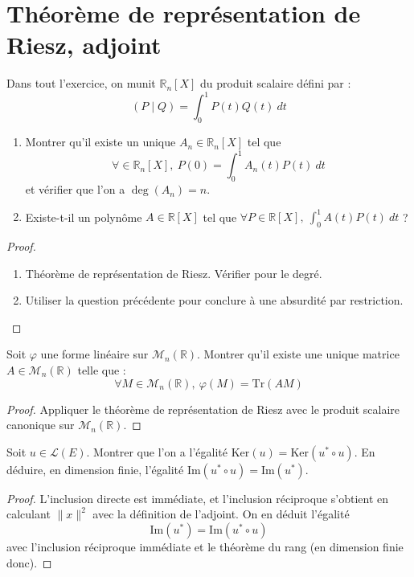 \documentclass[french,a4paper]{article}
\newcommand{\R}{\mathbb{R}}
\newcommand{\st}{^*}
\newcommand{\im}{\text{Im}}
\newcommand{\Tr}{\text{Tr}}
\theoremstyle{plain}
\theoremstyle{definition}
\theoremstyle{remark}
\begin{document}
\section{Théorème de représentation de Riesz, adjoint}

\begin{ex}{}
	Dans tout l'exercice, on munit $\R_n[X]$ du produit scalaire défini par : $$(P\mid Q)=\int_{0}^{1}P(t)Q(t)\ dt$$
	\begin{enumerate}
		\item Montrer qu'il existe un unique $A_n\in\R_n[X]$ tel que $$\forall \in\R_n[X],\ P(0)=\int_{0}^{1}A_n(t)P(t)\ dt$$ et vérifier que l'on a $\deg(A_n)=n$.
		\item Existe-t-il un polynôme $A\in\R[X]$ tel que $\forall P\in\R[X],\ \displaystyle\int_{0}^{1}A(t)P(t)\ dt$ ?
	\end{enumerate}
\end{ex}
\begin{proof}
	\begin{enumerate}
		\item Théorème de représentation de Riesz. Vérifier pour le degré.
		\item Utiliser la question précédente pour conclure à une absurdité par restriction.
	\end{enumerate}
\end{proof}

\begin{ex}{}
	Soit $\varphi$ une forme linéaire sur $\mathcal{M}_n(\R)$. Montrer qu'il existe une unique matrice $A\in\mathcal{M}_n(\R)$ telle que : $$\forall M\in\mathcal{M}_n(\R),\ \varphi(M)=\Tr(AM)$$
\end{ex}
\begin{proof}
	Appliquer le théorème de représentation de Riesz avec le produit scalaire canonique sur $\mathcal{M}_n(\R)$.
\end{proof}

\begin{ex}{}
	Soit $u\in\mathcal{L}(E)$. Montrer que l'on a l'égalité $\text{Ker}(u)=\text{Ker}(u\st\circ u)$. En déduire, en dimension finie, l'égalité $\im(u\st\circ u)=\im(u\st)$.
\end{ex}
\begin{proof}
	L'inclusion directe est immédiate, et l'inclusion réciproque s'obtient en calculant $\lVert x\rVert^2$ avec la définition de l'adjoint. On en déduit l'égalité $$\text{Im}(u\st)=\text{Im}(u\st\circ u)$$ avec l'inclusion réciproque immédiate et le théorème du rang (en dimension finie donc).
\end{proof}
\end{document}
